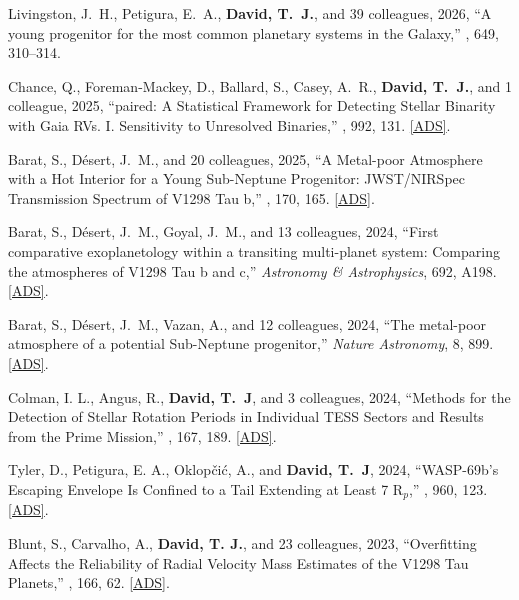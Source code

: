 \item {{Livingston}, J.~H.}, {{Petigura}, E.~A.}, {\bf{{David}, T.~J.}}, and 39 colleagues, 2026, ``A young progenitor for the most common planetary systems in the Galaxy,'' \nature, 649, 310--314.

\item {{Chance}, Q.}, {{Foreman-Mackey}, D.}, {{Ballard}, S.}, {{Casey}, A.~R.}, {\bf{{David}, T.~J.}}, and 1 colleague, 2025, ``paired: A Statistical Framework for Detecting Stellar Binarity with Gaia RVs. I. Sensitivity to Unresolved Binaries,'' \textit{\apj}, 992, 131. \href{https://ui.adsabs.harvard.edu/abs/2025ApJ...992..131C}{[ADS]}.

\item {{Barat}, S.}, {{D{\'e}sert}, J.~M.}, and 20 colleagues, 2025, ``A Metal-poor Atmosphere with a Hot Interior for a Young Sub-Neptune Progenitor: JWST/NIRSpec Transmission Spectrum of V1298 Tau b,'' \textit{\aj}, 170, 165. \href{https://ui.adsabs.harvard.edu/abs/2025AJ....170..165B}{[ADS]}.

\item {{Barat}, S.}, {{D{\'e}sert}, J.~M.}, {{Goyal}, J.~M.}, and 13 colleagues, 2024, ``First comparative exoplanetology within a transiting multi-planet system: Comparing the atmospheres of V1298 Tau b and c,'' \textit{Astronomy \& Astrophysics}, 692, A198. \href{https://ui.adsabs.harvard.edu/abs/2024A&A...692A.198B}{[ADS]}.

\item {{Barat}, S.}, {{D\'esert}, J.~M.}, {{Vazan}, A.}, and 12 colleagues, 2024, ``The metal-poor atmosphere of a potential Sub-Neptune progenitor,'' \textit{Nature Astronomy}, 8, 899. \href{https://ui.adsabs.harvard.edu/abs/2024NatAs...8..899B}{[ADS]}.

\item {{Colman}, I. L.}, {{Angus}, R.}, {\bf{{David}, T.~J}}, and 3 colleagues, 2024, ``{Methods for the Detection of Stellar Rotation Periods in Individual TESS Sectors and Results from the Prime Mission},'' \textit{\aj}, 167, 189. \href{https://ui.adsabs.harvard.edu/abs/2024AJ....167..189C}{[ADS]}.

\item {{Tyler}, D.}, {{Petigura}, E. A.}, {{Oklop{\v{c}}i{\'c}}, A.}, and {\bf{{David}, T.~J}}, 2024, ``{WASP-69b's Escaping Envelope Is Confined to a Tail Extending at Least 7 R$_p$},'' \textit{\apj}, 960, 123. \href{https://ui.adsabs.harvard.edu/abs/2024ApJ...960..123T}{[ADS]}.

\item {{Blunt}, S.}, {{Carvalho}, A.}, {\bf{{David}, T. J.}}, and 23 colleagues, 2023, ``{Overfitting Affects the Reliability of Radial Velocity Mass Estimates of the V1298 Tau Planets},'' \textit{\aj}, 166, 62. \href{https://ui.adsabs.harvard.edu/abs/2023AJ....166...62B}{[ADS]}.

